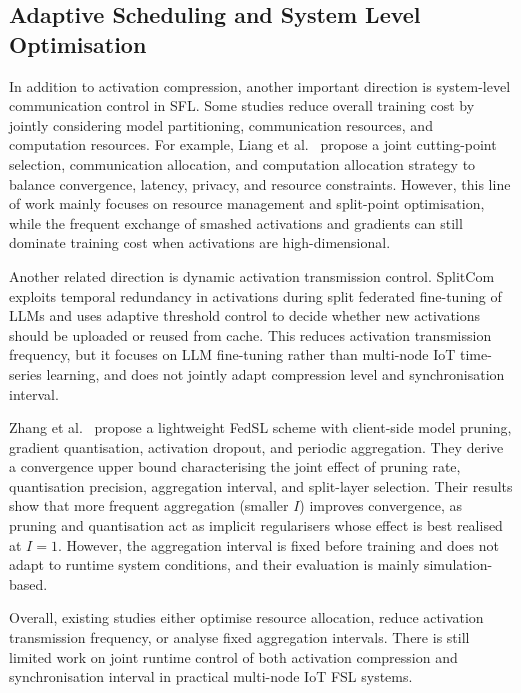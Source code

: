 \documentclass[conference]{IEEEtran}
\begin{document}
\subsection{Adaptive Scheduling and System Level Optimisation}

In addition to activation compression, another important direction is system-level communication control in SFL. Some studies reduce overall training cost by jointly considering model partitioning, communication resources, and computation resources. For example, Liang et al.~\cite{2026ITWC...25.1981L} propose a joint cutting-point selection, communication allocation, and computation allocation strategy to balance convergence, latency, privacy, and resource constraints. However, this line of work mainly focuses on resource management and split-point optimisation, while the frequent exchange of smashed activations and gradients can still dominate training cost when activations are high-dimensional.

Another related direction is dynamic activation transmission control. SplitCom~\cite{li2026splitcomcommunicationefficientsplitfederated} exploits temporal redundancy in activations during split federated fine-tuning of LLMs and uses adaptive threshold control to decide whether new activations should be uploaded or reused from cache. This reduces activation transmission frequency, but it focuses on LLM fine-tuning rather than multi-node IoT time-series learning, and does not jointly adapt compression level and synchronisation interval.

Zhang et al.~\cite{10791300} propose a lightweight FedSL scheme with client-side model pruning, gradient quantisation, activation dropout, and periodic aggregation. They derive a convergence upper bound characterising the joint effect of pruning rate, quantisation precision, aggregation interval, and split-layer selection. Their results show that more frequent aggregation (smaller $I$) improves convergence, as pruning and quantisation act as implicit regularisers whose effect is best realised at $I=1$. However, the aggregation interval is fixed before training and does not adapt to runtime system conditions, and their evaluation is mainly simulation-based.

Overall, existing studies either optimise resource allocation, reduce activation transmission frequency, or analyse fixed aggregation intervals. There is still limited work on joint runtime control of both activation compression and synchronisation interval in practical multi-node IoT FSL systems.
\end{document}
